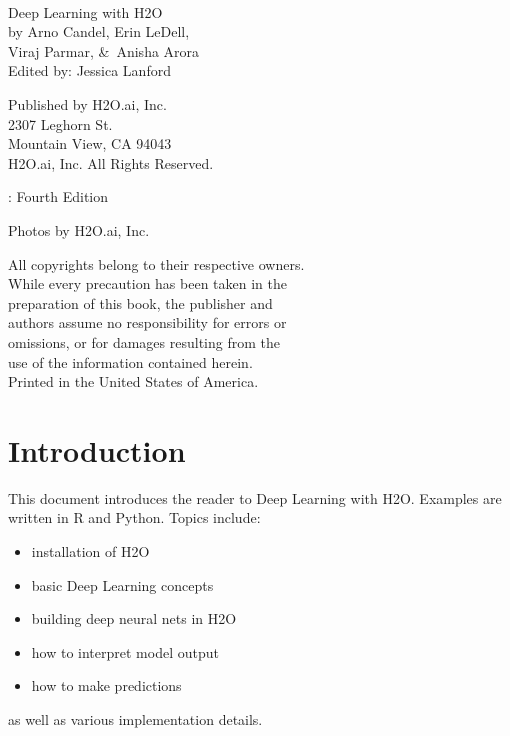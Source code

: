 

\newpage
\restoregeometry

\null\vfill %

\thispagestyle{empty}%
{\raggedright\vfill\ 

Deep Learning with H2O\\

by Arno Candel, Erin LeDell,\\
Viraj Parmar,  \&\ Anisha Arora  \\
Edited by: Jessica Lanford

\bigskip
  Published by H2O.ai, Inc. \\
2307 Leghorn St. \\
Mountain View, CA 94043\\
\bigskip
{} H2O.ai, Inc. All Rights Reserved. 
\bigskip

\monthname \hspace{1pt}  \the\year: Fourth Edition
\bigskip

Photos by \textcopyright H2O.ai, Inc. 
\bigskip

All copyrights belong to their respective owners.\\
While every precaution has been taken in the\\
preparation of this book, the publisher and\\
authors assume no responsibility for errors or\\
omissions, or for damages resulting from the\\
use of the information contained herein.\\
\bigskip
Printed in the United States of America. 
}

\newpage
\thispagestyle{empty}%
\tableofcontents
\thispagestyle{empty}%


\newpage

\section{Introduction}
This document introduces the reader to Deep Learning with H2O.  Examples are written in R and Python.
Topics include: 
\begin{itemize}
\item installation of H2O
\item basic Deep Learning concepts
\item building deep neural nets in H2O
\item how to interpret model output
\item how to make predictions
\end{itemize}
as well as various implementation details.

